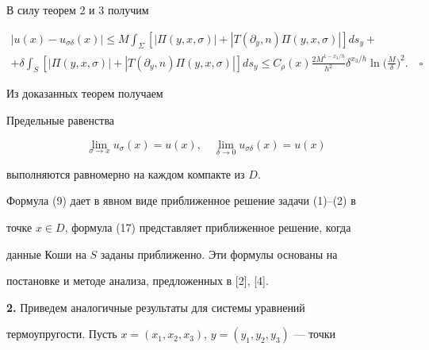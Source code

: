 В силу теорем 2 и 3 получим 


\begin{gather*} 


|u(x)-u_{\sigma\delta}(x)|\le M\int_\Sigma[|\Pi(y,x,\sigma)|+ 


|T(\partial_y,n)\Pi(y,x,\sigma)|]ds_y+ \\ 


% 


+\delta\int_S[|\Pi(y,x,\sigma)|+|T(\partial_y,n)\Pi(y,x,\sigma)|]ds_y\le 


C_\rho(x)\frac{2M^{1-x_3/h}}{h^2}\delta^{x_3/h}\ln\bigg( 


\frac{M}{\delta}\bigg)^2.\quad\square 


\end{gather*} 


 


 


Из доказанных теорем получаем 


 


 


\begin{cor} 


Предельные равенства 


$$ 


\lim_{\sigma\to x}u_\sigma(x)=u(x),\quad 


\lim_{\delta\to0}u_{\sigma\delta}(x)=u(x) 


$$ 


выполняются равномерно на каждом компакте из $D$. 


\end{cor} 


 


 


Формула (9) дает в явном виде приближенное решение задачи (1)--(2) в 


точке $x\in D$, формула (17) представляет приближенное решение, когда 


данные Коши на $S$ заданы приближенно. Эти формулы основаны на 


постановке и методе анализа, предложенных в [2], [4]. 


\medskip 


 


{\bf 2.} Приведем аналогичные результаты для системы уравнений 


термоупругости. Пусть $x=(x_1,x_2,x_3)$, $y=(y_1,y_2,y_3)$ --- точки 


